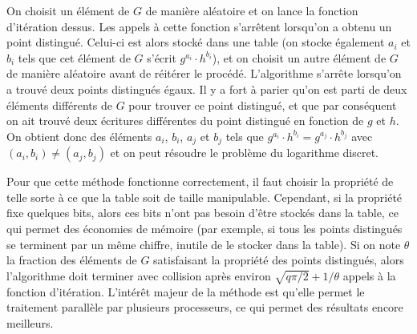         On choisit un élément de $G$ de manière aléatoire et on lance la fonction d'itération dessus. Les appels à cette fonction s'arrêtent lorsqu'on a obtenu un point distingué. Celui-ci est alors stocké dans une table (on stocke également $a_i$ et $b_i$ tels que cet élément de $G$ s'écrit $g^{a_i} \cdot h^{b_i}$), et on choisit un autre élément de $G$ de manière aléatoire avant de réitérer le procédé. L'algorithme s'arrête lorsqu'on a trouvé deux points distingués égaux. Il y a fort à parier qu'on est parti de deux éléments différents de $G$ pour trouver ce point distingué, et que par conséquent on ait trouvé deux écritures différentes du point distingué en fonction de $g$ et $h$. On obtient donc des éléments $a_i$, $b_i$, $a_j$ et $b_j$ tels que $g^{a_i} \cdot h^{b_i} = g^{a_j} \cdot h^{b_j}$ avec $(a_i,b_i) \neq (a_j,b_j)$ et on peut résoudre le problème du logarithme discret.

        Pour que cette méthode fonctionne correctement, il faut choisir la propriété de telle sorte à ce que la table soit de taille manipulable. Cependant, si la propriété fixe quelques bits, alors ces bits n'ont pas besoin d'être stockés dans la table, ce qui permet des économies de mémoire (par exemple, si tous les points distingués se terminent par un même chiffre, inutile de le stocker dans la table). Si on note $\theta$ la fraction des éléments de $G$ satisfaisant la propriété des points distingués, alors l'algorithme doit terminer avec collision après environ $\sqrt{q\pi/2} + 1/\theta$ appels à la fonction d'itération. L'intérêt majeur de la méthode est qu'elle permet le traitement parallèle par plusieurs processeurs, ce qui permet des résultats encore meilleurs.
